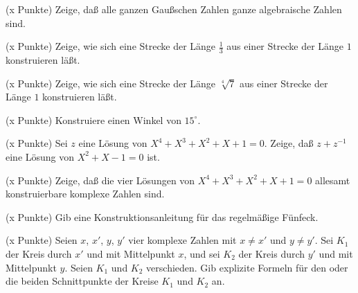 \documentclass{algsheet}
\author{Dipl.-Math.~Arturo Mancino}
\date{10.~November 2010}
\begin{document}
                \maketitle


\begin{exercise}(x Punkte)\newline
     Zeige, daß alle ganzen Gaußschen Zahlen ganze algebraische Zahlen sind.
\end{exercise}

\begin{exercise}(x Punkte)\newline
    Zeige, wie sich eine Strecke der Länge \(\frac 1 3\) aus einer Strecke der
    Länge \(1\) konstruieren läßt.
\end{exercise}

\begin{exercise}(x Punkte)\newline
    Zeige, wie sich eine Strecke der Länge \(\sqrt[4] 7\) aus einer Strecke der
    Länge \(1\) konstruieren läßt.
\end{exercise}

\begin{exercise}(x Punkte)\newline
    Konstruiere einen Winkel von \({15^\circ}\).
\end{exercise}

\begin{exercise}(x Punkte)\newline
    Sei \(z\) eine Lösung von \(X^4 + X^3 + X^2 + X + 1 = 0\). Zeige, daß
    \(z + z^{-1}\) eine Lösung von \(X^2 + X - 1 = 0\) ist.
\end{exercise}

\begin{exercise}(x Punkte)\newline
    Zeige, daß die vier Lösungen von \(X^4 + X^3 + X^2 + X + 1 = 0\) allesamt
    konstruierbare komplexe Zahlen sind.
\end{exercise}

\begin{exercise}(x Punkte)\newline
    Gib eine Konstruktionsanleitung für das regelmäßige Fünfeck.
\end{exercise}

\begin{exercise}(x Punkte)\newline
    Seien \(x\), \(x'\), \(y\), \(y'\) vier komplexe Zahlen mit \(x \neq x'\)
    und \(y \neq y'\). Sei \(K_1\) der Kreis durch \(x'\) und mit Mittelpunkt
    \(x\), und sei \(K_2\) der Kreis durch \(y'\) und mit Mittelpunkt \(y\).
    Seien \(K_1\) und \(K_2\) verschieden. Gib explizite Formeln für den oder die
    beiden Schnittpunkte der Kreise \(K_1\) und \(K_2\) an.
\end{exercise}
\end{document}
